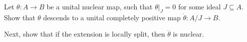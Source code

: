 \documentclass[10pt]{mypackage}
\begin{document}
\begin{exercise}[Exercise 2.1.9]
  Let $\theta\colon A\rightarrow B$ be a unital nuclear map, such that $\theta|_{J} = 0$ for some ideal $J\subseteq A$. Show that $\theta$ descends to a unital completely positive map $\dot{\theta}\colon A/J\rightarrow B$.\newline

  Next, show that if the extension is locally split, then $\dot{\theta}$ is nuclear.
  \begin{center}
  \end{center}
\end{exercise}
\end{document}
